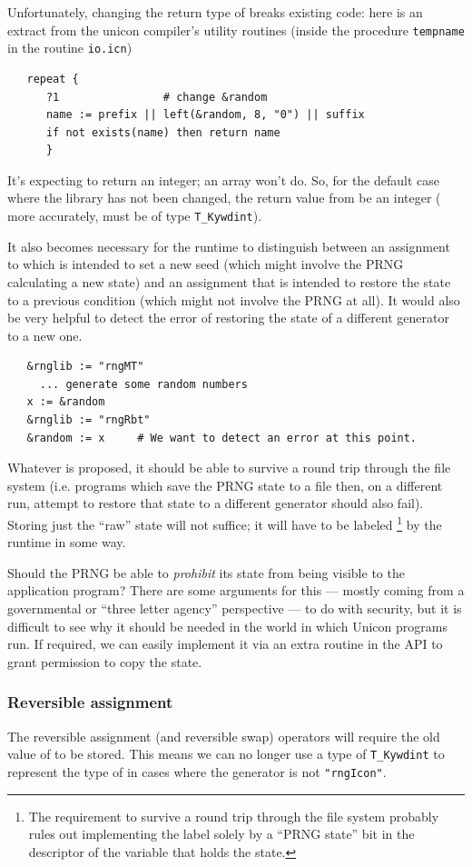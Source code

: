 \documentclass[letterpaper,12pt]{article}
\begin{document}
Unfortunately, changing the return type of \rndkwd breaks existing code:
here is an extract from the unicon compiler's utility routines (inside the
procedure \verb/tempname/ in the routine \verb/io.icn/)
\begin{verbatim}
   repeat {
      ?1				# change &random
      name := prefix || left(&random, 8, "0") || suffix
      if not exists(name) then return name
      }
\end{verbatim}
It's expecting \rndkwd to return an integer; an array won't do. So, for the
default case where the library has not been changed, the return value from
 be an integer ( more accurately, must be of type
\verb/T_Kywdint/).

It also becomes necessary for the runtime to distinguish between an
assignment to \rndkwd which is intended to set a new seed (which might
involve the PRNG calculating a new state) and an assignment that is
intended to restore the state to a previous condition (which might not
involve the PRNG at all). It would also be very helpful to detect the error
of restoring the state of a different generator to a new one.
\begin{verbatim}
   &rnglib := "rngMT"
     ... generate some random numbers
   x := &random
   &rnglib := "rngRbt"
   &random := x     # We want to detect an error at this point.
\end{verbatim}
Whatever is proposed, it should be able to survive a round trip through the
file system (i.e. programs which save the PRNG state to a file then, on a
different run, attempt to restore that state to a different generator should
also fail). Storing just the ``raw'' state will not suffice; it will have to
be labeled%
\footnote{
  The requirement to survive a round trip through the file system probably
  rules out implementing the label solely by a ``PRNG state'' bit in the
  descriptor of the variable that holds the state.
}
by the runtime in some way.

Should the PRNG be able to {\em prohibit} its state from being visible to the
application program? There are some arguments for this --- mostly coming
from a governmental or ``three letter agency'' perspective --- to do with
security, but it is difficult to see why it should be needed in the world
in which Unicon programs run. If required, we can easily implement it via an
extra routine in the API to grant permission to copy the state.

\subsubsection{Reversible assignment}
The reversible assignment (and reversible swap) operators will require the
old value of \rndkwd to be stored. This means we can no longer use a type
of \verb/T_Kywdint/ to represent the type of \rndkwd in cases where the
generator is not \verb/"rngIcon"/.
\end{document}
